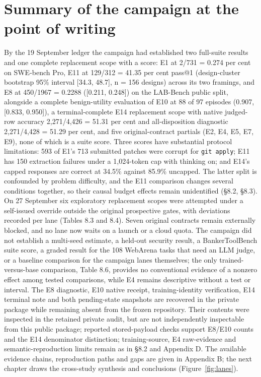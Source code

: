 \documentclass[12pt,a4paper]{report}
\begin{document}
\section{Summary of the campaign at the point of
writing}\label{summary-of-the-campaign-at-the-point-of-writing}

By the 19 September ledger the campaign had established two full-suite
results and one complete replacement scope with a score: E1 at 2/731 =
0.274 per cent on SWE-bench Pro, E11 at 129/312 = 41.35 per cent pass@1
(design-cluster bootstrap 95\% interval {[}34.3, 48.7{]}, n = 156
designs) across its two framings, and E8 at 450/1967 = 0.2288 ({[}0.211,
0.248{]}) on the LAB-Bench public split, alongside a complete
benign-utility evaluation of E10 at 88 of 97 episodes (0.907, {[}0.833,
0.950{]}), a terminal-complete E14 replacement scope with native
judged-row accuracy 2,271/4,426 = 51.31 per cent and all-disposition
diagnostic 2,271/4,428 = 51.29 per cent, and five original-contract
partials (E2, E4, E5, E7, E9), none of which is a suite score. Three
scores have substantial protocol limitations: 593 of E1's 713 submitted
patches were corrupt for \texttt{git\ apply}; E11 has 150 extraction
failures under a 1,024-token cap with thinking on; and E14's capped
responses are correct at 34.5\% against 85.9\% uncapped. The latter
split is confounded by problem difficulty, and the E11 comparison
changes several conditions together, so their causal budget effects
remain unidentified (§8.2, §8.3). On 27 September six exploratory
replacement scopes were attempted under a self-issued override outside
the original prospective gates, with deviations recorded per lane
(Tables 8.3 and 8.4). Seven original contracts remain externally
blocked, and no lane now waits on a launch or a cloud quota. The
campaign did not establish a multi-seed estimate, a held-out security
result, a BankerToolBench suite score, a graded result for the 108
WebArena tasks that need an LLM judge, or a baseline comparison for the
campaign lanes themselves; the only trained-versus-base comparison,
Table 8.6, provides no conventional evidence of a nonzero effect among
tested comparisons, while E4 remains descriptive without a test or
interval. The E8 diagnostic, E10 native receipt, training-identity
verification, E14 terminal note and both pending-state snapshots are
recovered in the private package while remaining absent from the frozen
repository. Their contents were inspected in the retained private audit,
but are not independently inspectable from this public package; reported
stored-payload checks support E8/E10 counts and the E14 denominator
distinction; training-source, E4 raw-evidence and semantic-reproduction
limits remain as in §8.2 and Appendix D. The available evidence chains,
reproduction paths and gaps are given in Appendix B; the next chapter
draws the cross-study synthesis and conclusions (Figure~\ref{fig:lanes}).
\end{document}
